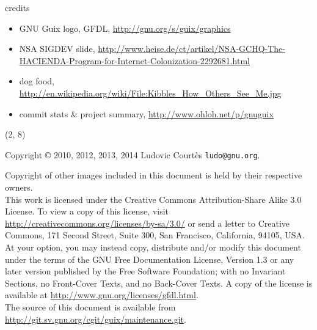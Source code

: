 \documentclass{beamer}
\begin{document}
\begin{frame}{credits}
  \small{
  \begin{itemize}
  \item GNU Guix logo, GFDL, \url{http://gnu.org/s/guix/graphics}
  \item NSA SIGDEV slide,
    \url{http://www.heise.de/ct/artikel/NSA-GCHQ-The-HACIENDA-Program-for-Internet-Colonization-2292681.html}
  \item dog food,
    \url{http://en.wikipedia.org/wiki/File:Kibbles_How_Others_See_Me.jpg}
  \item commit stats \& project summary,
    \url{http://www.ohloh.net/p/gnuguix}
  \end{itemize}
  }
\end{frame}

\begin{frame}{}

  \begin{textblock}{12}(2, 8)
    \tiny{
      Copyright \copyright{} 2010, 2012, 2013, 2014 Ludovic Courtès \texttt{ludo@gnu.org}.

      Copyright of other images included in this document is held by
      their respective owners.
      \\[3.0mm]
      This work is licensed under the \alert{Creative Commons
        Attribution-Share Alike 3.0} License.  To view a copy of this
      license, visit
      \url{http://creativecommons.org/licenses/by-sa/3.0/} or send a
      letter to Creative Commons, 171 Second Street, Suite 300, San
      Francisco, California, 94105, USA.
      \\[2.0mm]
      At your option, you may instead copy, distribute and/or modify
      this document under the terms of the \alert{GNU Free Documentation
        License, Version 1.3 or any later version} published by the Free
      Software Foundation; with no Invariant Sections, no Front-Cover
      Texts, and no Back-Cover Texts.  A copy of the license is
      available at \url{http://www.gnu.org/licenses/gfdl.html}.
      \\[2.0mm]
      The source of this document is available from
      \url{http://git.sv.gnu.org/cgit/guix/maintenance.git}.
    }
  \end{textblock}
\end{frame}
\end{document}
